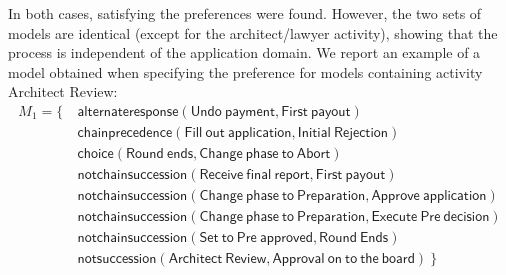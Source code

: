 In both cases,  %
satisfying the preferences were found. However, the two sets of models are identical (except for the architect/lawyer activity), showing that the process is independent of the application domain.
We report an example of a model obtained when specifying the preference for models containing activity \textsf{Architect Review}:
%
%
\begin{align*}
M_1 = \{ \ & \mathsf{ alternateresponse(Undo\ payment, First\ payout)} \\
& \mathsf{ chainprecedence(Fill\ out\ application, Initial\ Rejection)} \\
& \mathsf{ choice(Round\ ends, Change\ phase\ to\ Abort)} \\
& \mathsf{ notchainsuccession(Receive\ final\ report, First\ payout)} \\
& \mathsf{ notchainsuccession(Change\ phase\ to\ Preparation, Approve\ application)} \\
& \mathsf{ notchainsuccession(Change\ phase\ to\ Preparation, Execute\ Pre\ decision)} \\
& \mathsf{ notchainsuccession(Set\ to\ Pre\ approved, Round\ Ends)} \\
& \mathsf{ notsuccession(Architect\ Review, Approval\ on\ to\ the\ board)} \ \} 
\end{align*}


